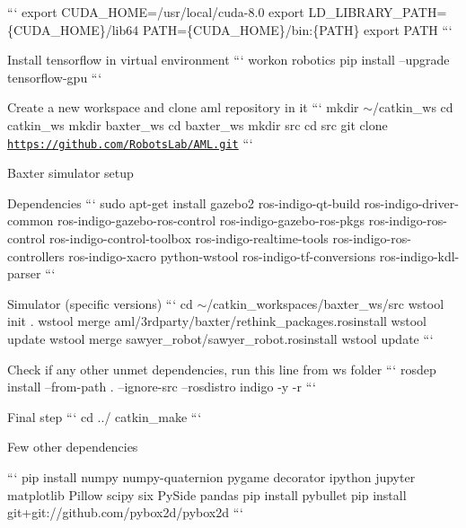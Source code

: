 \begin{DoxyEnumerate}
\begin{DoxyItemize}
``` export C\-U\-D\-A\-\_\-\-H\-O\-M\-E=/usr/local/cuda-\/8.0 export L\-D\-\_\-\-L\-I\-B\-R\-A\-R\-Y\-\_\-\-P\-A\-T\-H=\{C\-U\-D\-A\-\_\-\-H\-O\-M\-E\}/lib64 P\-A\-T\-H=\{C\-U\-D\-A\-\_\-\-H\-O\-M\-E\}/bin\-:\{P\-A\-T\-H\} export P\-A\-T\-H ```
\end{DoxyItemize}
\item Install tensorflow in virtual environment ``` workon robotics pip install --upgrade tensorflow-\/gpu ```
\item Create a new workspace and clone aml repository in it ``` mkdir $\sim$/catkin\-\_\-ws cd catkin\-\_\-ws mkdir baxter\-\_\-ws cd baxter\-\_\-ws mkdir src cd src git clone \href{https://github.com/RobotsLab/AML.git}{\tt https\-://github.\-com/\-Robots\-Lab/\-A\-M\-L.\-git} ```
\item Baxter simulator setup
\begin{DoxyItemize}
\item Dependencies ``` sudo apt-\/get install gazebo2 ros-\/indigo-\/qt-\/build ros-\/indigo-\/driver-\/common ros-\/indigo-\/gazebo-\/ros-\/control ros-\/indigo-\/gazebo-\/ros-\/pkgs ros-\/indigo-\/ros-\/control ros-\/indigo-\/control-\/toolbox ros-\/indigo-\/realtime-\/tools ros-\/indigo-\/ros-\/controllers ros-\/indigo-\/xacro python-\/wstool ros-\/indigo-\/tf-\/conversions ros-\/indigo-\/kdl-\/parser ```
\item Simulator (specific versions) ``` cd $\sim$/catkin\-\_\-workspaces/baxter\-\_\-ws/src wstool init . wstool merge aml/3rdparty/baxter/rethink\-\_\-packages.\-rosinstall wstool update wstool merge sawyer\-\_\-robot/sawyer\-\_\-robot.\-rosinstall wstool update ```
\end{DoxyItemize}
\end{DoxyEnumerate}

Check if any other unmet dependencies, run this line from ws folder ``` rosdep install --from-\/path . --ignore-\/src --rosdistro indigo -\/y -\/r ```


\begin{DoxyItemize}
\item Final step ``` cd ../ catkin\-\_\-make ```
\end{DoxyItemize}

Few other dependencies

``` pip install numpy numpy-\/quaternion pygame decorator ipython jupyter matplotlib Pillow scipy six Py\-Side pandas pip install pybullet pip install git+git\-://github.com/pybox2d/pybox2d ```


